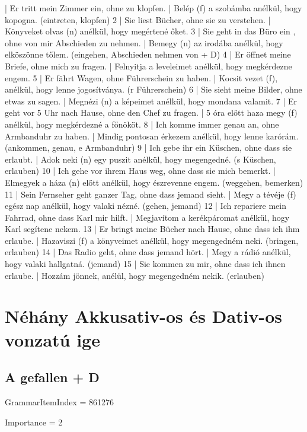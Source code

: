 \documentclass{article}
\newenvironment{exmp}{\verbatim}{\endverbatim}
\begin{document}
\begin{exmp}
1 | Er tritt mein Zimmer ein, ohne zu klopfen. | Belép (f) a szobámba anélkül, hogy kopogna. (eintreten, klopfen)
2 | Sie liest Bücher, ohne sie zu verstehen. | Könyveket olvas (n) anélkül, hogy megértené őket.
3 | Sie geht in das Büro ein , ohne von mir Abschieden zu nehmen. | Bemegy (n) az irodába anélkül, hogy elköszönne tőlem. (eingehen, Abschieden nehmen von + D)
4 | Er öffnet meine Briefe, ohne mich zu fragen. | Felnyitja a leveleimet anélkül, hogy megkérdezne engem.
5 | Er fährt Wagen, ohne Führerschein zu haben. | Kocsit vezet (f), anélkül, hogy lenne jogosítványa. (r Führerschein)
6 | Sie sieht meine Bilder, ohne etwas zu sagen. | Megnézi (n) a képeimet anélkül, hogy mondana valamit.
7 | Er geht vor 5 Uhr nach Hause, ohne den Chef zu fragen. | 5 óra előtt haza megy (f) anélkül, hogy megkérdezné a főnököt.
8 | Ich komme immer genau an, ohne Armbanduhr zu haben. | Mindig pontosan érkezem anélkül, hogy lenne karórám. (ankommen, genau, e Armbanduhr)
9 | Ich gebe ihr ein Küschen, ohne dass sie erlaubt. | Adok neki (n) egy puszit anélkül, hogy megengedné. (s Küschen, erlauben)
10 | Ich gehe vor ihrem Haus weg, ohne dass sie mich bemerkt. | Elmegyek a háza (n) előtt anélkül, hogy észrevenne engem. (weggehen, bemerken)
11 | Sein Fernseher geht ganzer Tag, ohne dass jemand sieht. | Megy a tévéje (f) egész nap anélkül, hogy valaki nézné. (gehen, jemand)
12 | Ich repariere mein Fahrrad, ohne dass Karl mir hilft. | Megjavítom a kerékpáromat anélkül, hogy Karl segítene nekem.
13 | Er bringt meine Bücher nach Hause, ohne dass ich ihm erlaube. | Hazaviszi (f) a könyveimet anélkül, hogy megengedném neki. (bringen, erlauben)
14 | Das Radio geht, ohne dass jemand hört. | Megy a rádió anélkül, hogy valaki hallgatná. (jemand)
15 | Sie kommen zu mir, ohne dass ich ihnen erlaube. | Hozzám jönnek, anélül, hogy megengedném nekik. (erlauben)
\end{exmp}

\section{Néhány Akkusativ-os és Dativ-os vonzatú ige}

\subsection{A gefallen + D}

GrammarItemIndex = 861276

Importance = 2
\end{document}
